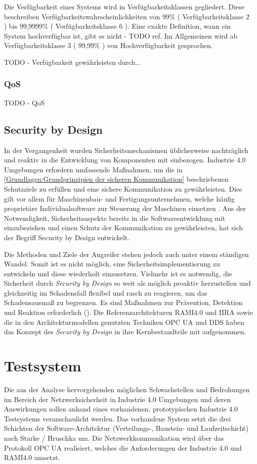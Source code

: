 Die Verfügbarkeit eines Systems wird in Verfügbarkeitsklassen gegliedert. Diese beschreiben Verfügbarkeitswahrscheinlichkeiten von 99\% ( Verfügbarkeitsklasse 2 ) bis 99,9999\% ( Verfügbarkeitsklasse 6 ). Eine exakte Definition, wann ein System hochverfügbar ist, gibt es nicht - TODO ref. Im Allgemeinen wird ab Verfügbarkeitsklasse 3 ( 99,99\% ) von Hochverfügbarkeit gesprochen.

TODO - Verfügbarkeit gewährleisten durch...

\subsubsection{\ac{QoS}}
TODO - \ac{QoS}

\subsection{Security by Design}
In der Vergangenheit wurden Sicherheitsmechanismen üblicherweise nachträglich und reaktiv in die Entwicklung von Komponenten mit einbezogen. Industrie 4.0 Umgebungen erfordern umfassende Maßnahmen, um die in \autoref{Grundlagen:Grundprinzipien der sicheren Kommunikation} beschriebenen Schutzziele zu erfüllen und eine sichere Kommunikation zu gewährleisten. Dies gilt vor allem für Maschinenbau- und Fertigungsunternehmen, welche häufig proprietäre Individualsoftware zur Steuerung der Maschinen einsetzen \cite{DTAG2016}. Aus der Notwendigkeit, Sicherheitsaspekte bereits in die Softwareentwicklung mit einzubeziehen und einen Schutz der Kommunikation zu gewährleisten, hat sich der Begriff Security by Design entwickelt.

Die Methoden und Ziele der Angreifer stehen jedoch auch unter einem ständigen Wandel. Somit ist es nicht möglich, eine Sicherheitsimplementierung zu entwickeln und diese wiederholt einzusetzen. Vielmehr ist es notwendig, die Sicherheit durch \textit{Security by Design} so weit als möglich proaktiv herzustellen und gleichzeitig im Schadensfall flexibel und rasch zu reagieren, um das Schadensausmaß zu begrenzen. Es sind Maßnahmen zur Prävention, Detektion und Reaktion erforderlich (\cite{Umsetzung2015}). Die Referenzarchitekturen \ac{RAMI4.0} und \ac{IIRA} sowie die in den Architekturmodellen genutzten Techniken \ac{OPC UA} und \ac{DDS} haben das Konzept des \textit{Security by Design} in ihre Kernbestandteile mit aufgenommen.

\section{Testsystem}
\label{Grundlagen:Testsystem}
Die aus der Analyse hervorgehenden möglichen Schwachstellen und Bedrohungen im Bereich der Netzwerksicherheit in Industrie 4.0 Umgebungen und deren Auswirkungen sollen anhand eines vorhandenen, prototypischen Industrie 4.0 Testsystems \cite{Weber2018} veranschaulicht werden. Das vorhandene System setzt die drei Schichten der Software-Architektur (Verteilungs-, Baustein- und Laufzeitschicht) nach Starke / Hruschka um. Die Netzwerkkommunikation wird über das Protokoll \ac{OPC UA} realisiert, welches die Anforderungen der Industrie 4.0 und \ac{RAMI4.0} umsetzt.

